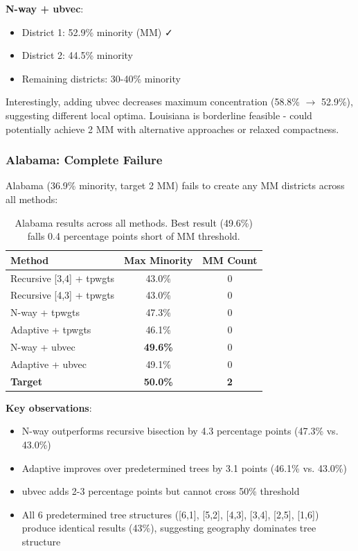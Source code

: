 \textbf{N-way + ubvec}:
\begin{itemize}
\item District 1: 52.9\% minority (MM) ✓
\item District 2: 44.5\% minority
\item Remaining districts: 30-40\% minority
\end{itemize}

Interestingly, adding ubvec decreases maximum concentration (58.8\% $\to$ 52.9\%), suggesting different local optima. Louisiana is borderline feasible - could potentially achieve 2 MM with alternative approaches or relaxed compactness.

\subsubsection{Alabama: Complete Failure}

Alabama (36.9\% minority, target 2 MM) fails to create any MM districts across all methods:

\begin{table}[h]
\centering
\begin{tabular}{lcc}
\toprule
Method & Max Minority & MM Count \\
\midrule
Recursive [3,4] + tpwgts & 43.0\% & 0 \\
Recursive [4,3] + tpwgts & 43.0\% & 0 \\
N-way + tpwgts & 47.3\% & 0 \\
Adaptive + tpwgts & 46.1\% & 0 \\
N-way + ubvec & \textbf{49.6\%} & 0 \\
Adaptive + ubvec & 49.1\% & 0 \\
\midrule
\textbf{Target} & \textbf{50.0\%} & \textbf{2} \\
\bottomrule
\end{tabular}
\caption{Alabama results across all methods. Best result (49.6\%) falls 0.4 percentage points short of MM threshold.}
\label{tab:alabama}
\end{table}

\textbf{Key observations}:
\begin{itemize}
\item N-way outperforms recursive bisection by 4.3 percentage points (47.3\% vs. 43.0\%)
\item Adaptive improves over predetermined trees by 3.1 points (46.1\% vs. 43.0\%)
\item ubvec adds 2-3 percentage points but cannot cross 50\% threshold
\item All 6 predetermined tree structures ([6,1], [5,2], [4,3], [3,4], [2,5], [1,6]) produce identical results (43\%), suggesting geography dominates tree structure
\end{itemize}

